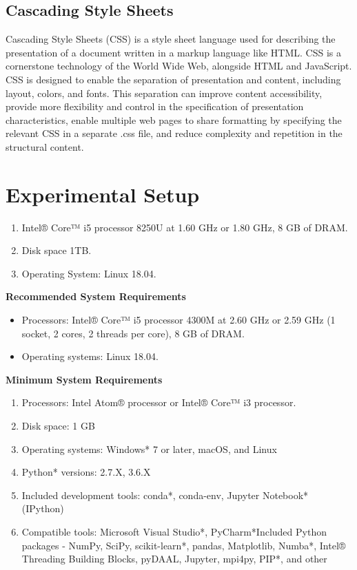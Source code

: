 \documentclass[oneside,12pt]{Classes/VTU}
\begin{document}
	\subsection{Cascading Style Sheets}
	Cascading Style Sheets (CSS) is a style sheet language used for describing the presentation of a document written in a markup language like HTML. CSS is a cornerstone technology of the World Wide Web, alongside HTML and JavaScript. CSS is designed to enable the separation of presentation and content, including layout, colors, and fonts. This separation can improve content accessibility, provide more flexibility and control in the specification of presentation characteristics, enable multiple web pages to share formatting by specifying the relevant CSS in a separate .css file, and reduce complexity and repetition in the structural content.
	
	\section{Experimental Setup}
	\begin{enumerate}
		\item Intel® Core™ i5 processor 8250U at 1.60 GHz or 1.80 GHz, 8 GB of DRAM.
		\item Disk space 1TB.
		\item Operating System: Linux 18.04. 
	\end{enumerate}
	
	\textbf{Recommended System Requirements}  
	
	\begin{itemize}
		\item Processors: Intel® Core™ i5 processor 4300M at 2.60 GHz or 2.59 GHz (1 socket, 2 cores, 2 threads per core), 8 GB of DRAM. 
		\item Operating systems:  Linux 18.04.
	\end{itemize}
	
	\textbf{Minimum System Requirements}
	
	\begin{enumerate}
		\item Processors: Intel Atom® processor or Intel® Core™ i3 processor.
		\item Disk space: 1 GB 
		\item Operating systems: Windows* 7 or later, macOS, and Linux 
		\item Python* versions: 2.7.X, 3.6.X 
		\item Included development tools: conda*, conda-env, Jupyter Notebook* (IPython) 
		\item Compatible tools: Microsoft Visual Studio*, PyCharm*Included Python packages - NumPy, SciPy, scikit-learn*, pandas, Matplotlib, Numba*, Intel® Threading Building Blocks, pyDAAL, Jupyter, mpi4py, PIP*, and other 
	\end{enumerate}
\end{document}
